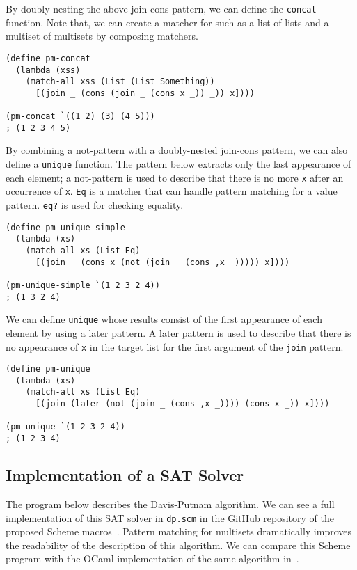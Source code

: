 \documentclass[acmlarge]{acmart}
\newcommand{\todo}[1]{\textcolor{red}{(TODO: #1)}}
\begin{document}
\noindent By doubly nesting the above join-cons pattern, we can define the \lstinline{concat} function.
Note that, we can create a matcher for such as a list of lists and a multiset of multisets by composing matchers.

\begin{lstlisting}[language=egison]
(define pm-concat
  (lambda (xss)
    (match-all xss (List (List Something))
      [(join _ (cons (join _ (cons x _)) _)) x])))

(pm-concat `((1 2) (3) (4 5)))
; (1 2 3 4 5)
\end{lstlisting}

By combining a not-pattern with a doubly-nested join-cons pattern, we can also define a \lstinline{unique} function.
The pattern below extracts only the last appearance of each element; a not-pattern is used to describe that there is no more \lstinline{x} after an occurrence of \lstinline{x}.
\texttt{Eq} is a matcher that can handle pattern matching for a value pattern.
\texttt{eq?} is used for checking equality.

\begin{lstlisting}[language=egison]
(define pm-unique-simple
  (lambda (xs)
    (match-all xs (List Eq)
      [(join _ (cons x (not (join _ (cons ,x _))))) x])))

(pm-unique-simple `(1 2 3 2 4))
; (1 3 2 4)
\end{lstlisting}

\noindent We can define \lstinline{unique} whose results consist of the first appearance of each element by using a later pattern.
A later pattern is used to describe that there is no appearance of \texttt{x} in the target list for the first argument of the \texttt{join} pattern.

{\footnotesize
\begin{lstlisting}[language=egison]
(define pm-unique
  (lambda (xs)
    (match-all xs (List Eq)
      [(join (later (not (join _ (cons ,x _)))) (cons x _)) x])))

(pm-unique `(1 2 3 2 4))
; (1 2 3 4)
\end{lstlisting}
}

\subsection{Implementation of a SAT Solver}

The program below describes the Davis-Putnam algorithm.
We can see a full implementation of this SAT solver in \texttt{dp.scm} in the GitHub repository of the proposed Scheme macros~\cite{egisonScheme}.
Pattern matching for multisets dramatically improves the readability of the description of this algorithm.
We can compare this Scheme program with the OCaml implementation of the same algorithm in~\cite{harrison2009handbook}.
\end{document}
